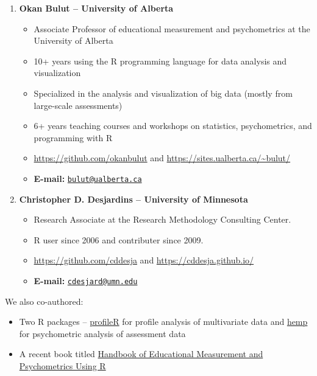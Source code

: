 \documentclass[]{book}
\providecommand{\tightlist}{%
  \setlength{\itemsep}{0pt}\setlength{\parskip}{0pt}}
\begin{document}
\begin{enumerate}
\def\labelenumi{\arabic{enumi}.}
\item
  \textbf{Okan Bulut -- University of Alberta}

  \begin{itemize}
  \tightlist
  \item
    Associate Professor of educational measurement and psychometrics at the University of Alberta
  \item
    10+ years using the R programming language for data analysis and visualization
  \item
    Specialized in the analysis and visualization of big data (mostly from large-scale assessments)
  \item
    6+ years teaching courses and workshops on statistics, psychometrics, and programming with R
  \item
    \url{https://github.com/okanbulut} and \url{https://sites.ualberta.ca/~bulut/}
  \item
    \textbf{E-mail:} \href{mailto:bulut@ualberta.ca}{\nolinkurl{bulut@ualberta.ca}}
  \end{itemize}
\item
  \textbf{Christopher D. Desjardins -- University of Minnesota}

  \begin{itemize}
  \tightlist
  \item
    Research Associate at the Research Methodology Consulting Center.
  \item
    R user since 2006 and contributer since 2009.
  \item
    \url{https://github.com/cddesja} and \url{https://cddesja.github.io/}
  \item
    \textbf{E-mail:} \href{mailto:cdesjard@umn.edu}{\nolinkurl{cdesjard@umn.edu}}
  \end{itemize}
\end{enumerate}

We also co-authored:

\begin{itemize}
\tightlist
\item
  Two R packages -- \href{https://cran.r-project.org/web/packages/profileR/index.html}{profileR} for profile analysis of multivariate data and \href{https://github.com/cddesja/hemp}{hemp} for psychometric analysis of assessment data
\item
  A recent book titled \href{https://www.crcpress.com/Handbook-of-Educational-Measurement-and-Psychometrics-Using-R/Desjardins-Bulut/p/book/9781498770132}{Handbook of Educational Measurement and Psychometrics Using R}
\end{itemize}
\end{document}
